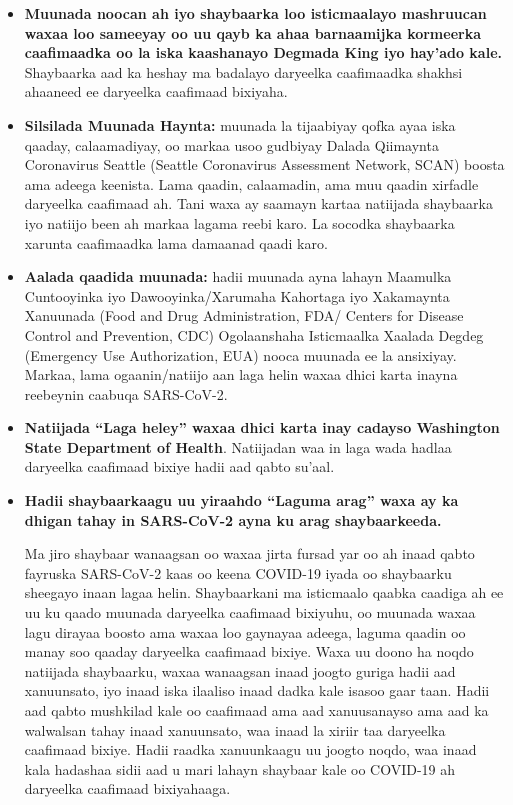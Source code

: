 \documentclass[10pt]{article}
\begin{document}
\begin{itemize}
\item

  \textbf{Muunada noocan ah iyo shaybaarka loo isticmaalayo mashruucan waxaa loo
  sameeyay oo uu qayb ka ahaa barnaamijka kormeerka caafimaadka oo la iska
  kaashanayo Degmada King iyo hay'ado kale.} Shaybaarka aad ka heshay ma
  badalayo daryeelka caafimaadka shakhsi ahaaneed ee daryeelka caafimaad
  bixiyaha.

\item

  \textbf{Silsilada Muunada Haynta:} muunada la tijaabiyay qofka ayaa iska
  qaaday, calaamadiyay, oo markaa usoo gudbiyay Dalada Qiimaynta Coronavirus
  Seattle (Seattle Coronavirus Assessment Network, SCAN) boosta ama adeega
  keenista. Lama qaadin, calaamadin, ama muu qaadin xirfadle daryeelka caafimaad
  ah. Tani waxa ay saamayn kartaa natiijada shaybaarka iyo natiijo been ah
  markaa lagama reebi karo. La socodka shaybaarka xarunta caafimaadka lama
  damaanad qaadi karo.

\item

  \textbf{Aalada qaadida muunada:} hadii muunada ayna lahayn Maamulka
  Cuntooyinka iyo Dawooyinka/Xarumaha Kahortaga iyo Xakamaynta Xanuunada (Food
  and Drug Administration, FDA/ Centers for Disease Control and Prevention, CDC)
   Ogolaanshaha Isticmaalka Xaalada Degdeg (Emergency Use Authorization, EUA)
   nooca muunada ee la ansixiyay. Markaa, lama ogaanin/natiijo aan laga helin
   waxaa dhici karta inayna reebeynin caabuqa SARS-CoV-2.

\item

  \textbf{Natiijada ``Laga heley'' waxaa dhici karta inay cadayso Washington
  State Department of Health}. Natiijadan waa in laga wada hadlaa daryeelka
  caafimaad bixiye hadii aad qabto su'aal.

\item{
  \textbf{Hadii shaybaarkaagu uu yiraahdo ``Laguma arag'' waxa ay ka dhigan tahay
  in SARS-CoV-2 ayna ku arag shaybaarkeeda.}

  Ma jiro shaybaar wanaagsan oo waxaa jirta fursad yar oo ah inaad qabto
  fayruska SARS-CoV-2 kaas oo keena COVID-19 iyada oo shaybaarku sheegayo inaan
  lagaa helin.  Shaybaarkani ma isticmaalo qaabka caadiga ah ee uu ku qaado
  muunada daryeelka caafimaad bixiyuhu, oo muunada waxaa lagu dirayaa boosto ama
  waxaa loo gaynayaa adeega, laguma qaadin oo manay soo qaaday daryeelka
  caafimaad bixiye.  Waxa uu doono ha noqdo natiijada shaybaarku, waxaa
  wanaagsan inaad joogto guriga hadii aad xanuunsato, iyo inaad iska ilaaliso
  inaad dadka kale isasoo gaar taan. Hadii aad qabto mushkilad kale oo caafimaad
  ama aad xanuusanayso ama aad ka walwalsan tahay inaad xanuunsato, waa inaad la
  xiriir taa daryeelka caafimaad bixiye.  Hadii raadka xanuunkaagu uu joogto
  noqdo, waa inaad kala hadashaa sidii aad u mari lahayn shaybaar kale oo
  COVID-19 ah daryeelka caafimaad bixiyahaaga.
}


\end{itemize}
\end{document}
